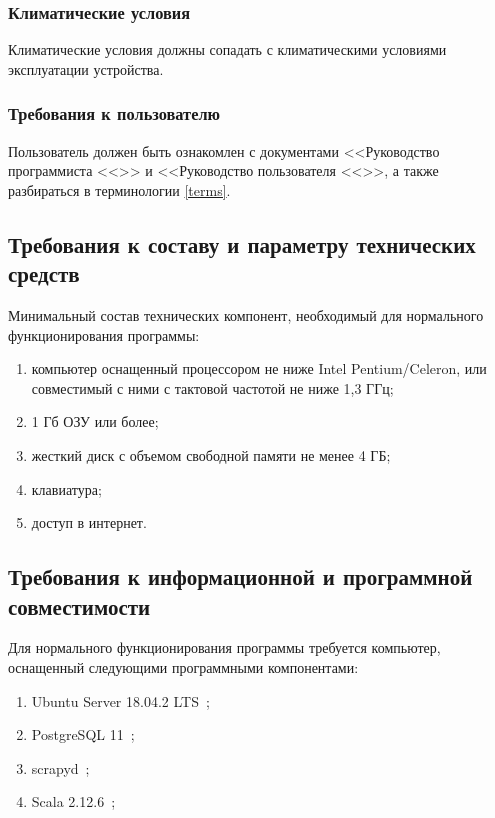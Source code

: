 \documentclass[a4paper,12pt,reqno]{article}
\begin{document}
	\subsubsection{Климатические условия}
	Климатические условия должны сопадать с климатическими условиями эксплуатации устройства. 
	\subsubsection{Требования к пользователю}
	
	Пользователь должен быть ознакомлен с документами <<Руководство программиста  <<>> и <<Руководство пользователя <<>>, а также разбираться в терминологии \ref{terms}.
	\subsection{Требования к составу и параметру технических средств}
	
	Минимальный состав технических компонент, необходимый для нормального функционирования программы:
    
    \begin{enumerate}
        \item компьютер оснащенный процессором не ниже Intel Pentium/Celeron, или совместимый с ними с тактовой частотой не ниже 1,3 ГГц;
        \item 1 Гб ОЗУ или более;
        \item жесткий диск с объемом свободной памяти не менее 4 ГБ;
        \item клавиатура;
        \item доступ в интернет.
    \end{enumerate}
	
	
	\subsection{Требования к информационной и программной совместимости}
	
	Для нормального функционирования программы требуется компьютер, оснащенный следующими программными компонентами:
    
    \begin{enumerate}
        \item Ubuntu Server 18.04.2 LTS~\cite{ubuntu};
        \item PostgreSQL 11~\cite{postgresql};
        \item scrapyd~\cite{scrapyd};
        \item Scala 2.12.6~\cite{scala};
    \end{enumerate}
	
\end{document}
